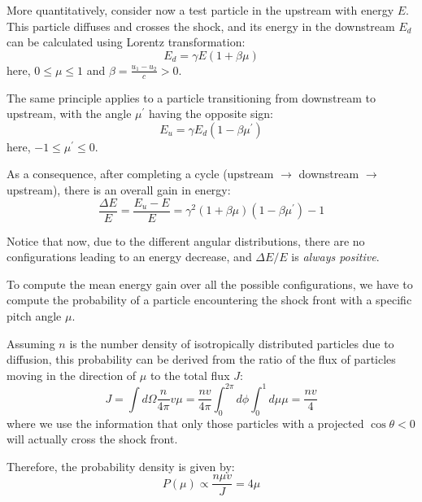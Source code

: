 More quantitatively, consider now a test particle in the upstream with energy \( E \). This particle diffuses and crosses the shock, and its energy in the downstream \( E_d \) can be calculated using Lorentz transformation:
%
\begin{equation}
E_d = \gamma E (1 + \beta \mu)
\end{equation}
%
here, \( 0 \le \mu \le 1 \) and \( \beta = \frac{u_1 - u_2}{c} > 0 \).

The same principle applies to a particle transitioning from downstream to upstream, with the angle \( \mu^\prime \) having the opposite sign:
%
\begin{equation}
E_u = \gamma E_d (1 - \beta \mu^\prime)
\end{equation}
here, \( -1 \le \mu^\prime \le 0 \).

As a consequence, after completing a cycle (upstream $\rightarrow$ downstream $\rightarrow$ upstream), there is an overall gain in energy:
%
\begin{equation}
\frac{\Delta E}{E} = \frac{E_u - E}{E} = \gamma^2 (1 + \beta \mu) (1 - \beta \mu^\prime) - 1
\end{equation}

Notice that now, due to the different angular distributions, there are no configurations leading to an energy decrease, and \( \Delta E / E \) is \emph{always positive}.

To compute the mean energy gain over all the possible configurations, we have to compute the probability of a particle encountering the shock front with a specific pitch angle \( \mu \). 

Assuming \( n \) is the number density of isotropically distributed particles due to diffusion, this probability can be derived from the ratio of the flux of particles moving in the direction of \( \mu \) to the total flux \( J \):
%
\begin{equation}
J = \int d\Omega \frac{n}{4\pi} v \mu = \frac{n v}{4\pi} \int_0^{2\pi} d\phi \int_0^1 d\mu \mu = \frac{n v}{4}
\end{equation}
%
where we use the information that only those particles with a projected \( \cos \theta < 0 \) will actually cross the shock front.

Therefore, the probability density is given by:
%
\begin{equation}
P(\mu) \propto \frac{n \mu v}{J} = 4 \mu
\end{equation}

